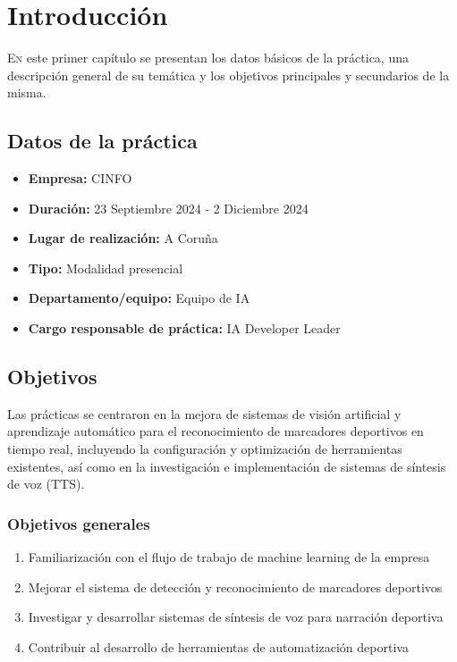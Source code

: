 \chapter{Introducción}
\label{chap:introduccion}

\lettrine{E}{n} este primer capítulo se presentan los datos básicos de la práctica, una descripción general de su temática y los objetivos principales y secundarios de la misma.

\section{Datos de la práctica}
\label{sec:datospractica}
\begin{itemize}
    \item {\bf Empresa:} CINFO
    \item {\bf Duración:} 23 Septiembre 2024 - 2 Diciembre 2024
    \item {\bf Lugar de realización:} A Coruña
    \item {\bf Tipo:} Modalidad presencial
    \item {\bf Departamento/equipo:} Equipo de IA
    \item {\bf Cargo responsable de práctica:} IA Developer Leader
\end{itemize}

\section{Objetivos}
\label{sec:objetivos}

Las prácticas se centraron en la mejora de sistemas de visión artificial y aprendizaje automático para el reconocimiento de marcadores deportivos en tiempo real, incluyendo la configuración y optimización de herramientas existentes, así como en la investigación e implementación de sistemas de síntesis de voz (TTS).

\subsection{Objetivos generales}
\begin{enumerate}
    \item Familiarización con el flujo de trabajo de machine learning de la empresa
    \item Mejorar el sistema de detección y reconocimiento de marcadores deportivos
    \item Investigar y desarrollar sistemas de síntesis de voz para narración deportiva
    \item Contribuir al desarrollo de herramientas de automatización deportiva
\end{enumerate}

